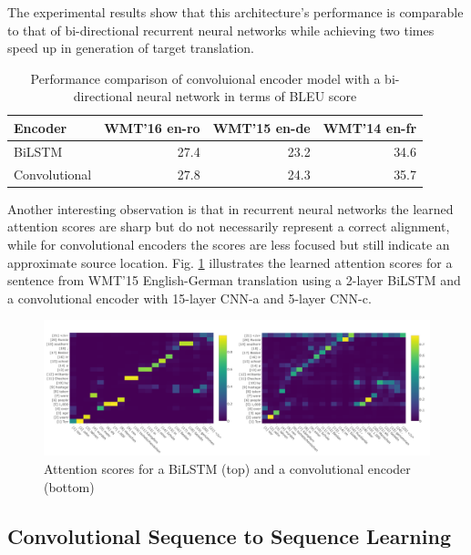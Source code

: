 \documentclass[a4paper]{article}
\begin{document}
The experimental results show that this architecture's performance is comparable
to  that of bi-directional recurrent neural networks  while  achieving two times
speed up in generation of target translation.


\begin{table}
  \center
  \begin{tabular}{lrrr}
  \hline
    Encoder & WMT'16 en-ro & WMT'15 en-de & WMT'14 en-fr \\
  \hline
    BiLSTM & 27.4 & 23.2 & 34.6 \\
    Convolutional & 27.8 & 24.3 & 35.7 \\
  \hline
  \end{tabular}
  \caption{Performance  comparison  of  convoluional  encoder  model  with a bi-
  directional neural network in terms of BLEU score}
\end{table}


Another interesting observation is that in recurrent neural networks the learned
attention scores are sharp but do not necessarily represent a correct alignment,
while for convolutional encoders the  scores are less focused but still indicate
an approximate source  location.  Fig.  \ref{fig:atts}  illustrates  the learned
attention scores  for a  sentence from WMT'15 English-German translation using a
2-layer  BiLSTM  and  a convolutional  encoder with  15-layer CNN-a  and 5-layer
CNN-c.


\begin{figure}
  \center
  \includegraphics[width=\textwidth]{img/atts}
  \caption{Attention scores  for  a  BiLSTM  (top) and a  convolutional  encoder
  (bottom)}
  \label{fig:atts}
\end{figure}


\subsection{Convolutional Sequence to Sequence Learning}
\end{document}

